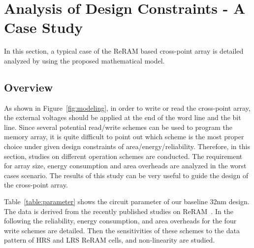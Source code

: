 \section{Analysis of Design Constraints - A Case Study}\label{sec:w_and_r}

In this section, a typical case of the ReRAM based cross-point array is detailed analyzed by using the proposed mathematical model.

\subsection{Overview}
As shown in Figure~\ref{fig:modeling}, in order to write or read the
cross-point array, the external voltages should be applied at the end of
the word line and the bit line. Since several potential
read/write schemes can be used to program the memory array, it is
quite difficult to point out which scheme is the most proper choice under given design constraints of area/energy/reliability. Therefore, in this section, studies on different operation schemes are conducted. The requirement for array size, energy consumption and area overheads are analyzed in the worst cases scenario. The results of this study can be very useful to guide the design of the cross-point array.


Table~\ref{table:parameter} shows the circuit parameter of our baseline 32nm design. The data is derived from the recently published studies on ReRAM~\cite{crossbar_TED_2010}\cite{memristor:Cong}. In the following the
reliability, energy consumption, and area overheads for the four write
schemes are detailed. Then the sensitivities of these schemes to the data
pattern of HRS and LRS ReRAM cells, and non-linearity are studied.

